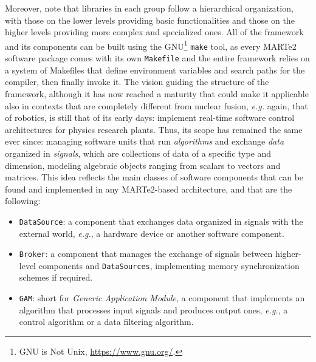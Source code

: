 Moreover, note that libraries in each group follow a hierarchical organization, with those on the lower levels providing basic functionalities and those on the higher levels providing more complex and specialized ones. All of the framework and its components can be built using the GNU\footnote{GNU is Not Unix, \href{https://www.gnu.org/}{https://www.gnu.org/}.} \texttt{make} tool, as every MARTe2 software package comes with its own \texttt{Makefile} and the entire framework relies on a system of Makefiles that define environment variables and search paths for the compiler, then finally invoke it. The vision guiding the structure of the framework, although it has now reached a maturity that could make it applicable also in contexts that are completely different from nuclear fusion, \emph{e.g.} again, that of robotics, is still that of its early days: implement real-time software control architectures for physics research plants. Thus, its scope has remained the same ever since: managing software units that run \emph{algorithms} and exchange \emph{data} organized in \emph{signals}, which are collections of data of a specific type and dimension, modeling algebraic objects ranging from scalars to vectors and matrices. This idea reflects the main classes of software components that can be found and implemented in any MARTe2-based architecture, and that are the following:
\begin{itemize}
  \item \texttt{DataSource}: a component that exchanges data organized in signals with the external world, \emph{e.g.}, a hardware device or another software component.
  \item \texttt{Broker}: a component that manages the exchange of signals between higher-level components and \texttt{DataSources}, implementing memory synchronization schemes if required.
  \item \texttt{GAM}: short for \emph{Generic Application Module}, a component that implements an algorithm that processes input signals and produces output ones, \emph{e.g.}, a control algorithm or a data filtering algorithm.
\end{itemize}

